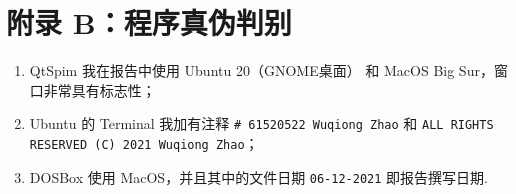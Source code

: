 \documentclass[11pt]{SEU-Digital-Report}
\begin{document}
    \section*{附录 B：程序真伪判别}

    \begin{enumerate}
      \item QtSpim 我在报告中使用 Ubuntu 20（GNOME桌面） 和 MacOS Big Sur，窗口非常具有标志性；
      \item Ubuntu 的 Terminal 我加有注释 \texttt{\# 61520522 Wuqiong Zhao} 和 \texttt{ALL RIGHTS RESERVED (C) 2021 Wuqiong Zhao}；
      \item DOSBox 使用 MacOS，并且其中的文件日期 \texttt{06-12-2021} 即报告撰写日期.
    \end{enumerate}
\end{document}
